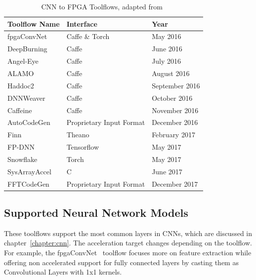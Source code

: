 \begin{table}[!htpb]
    \centering
    \begin{tabular}{lll}
    \hline
    \textbf{Toolflow Name} & \textbf{Interface}       & \textbf{Year}  \\ \hline
    fpgaConvNet            & Caffe \& Torch           & May 2016       \\
    DeepBurning            & Caffe                    & June 2016      \\
    Angel-Eye              & Caffe                    & July 2016      \\
    ALAMO                  & Caffe                    & August 2016    \\
    Haddoc2                & Caffe                    & September 2016 \\
    DNNWeaver              & Caffe                    & October 2016   \\
    Caffeine               & Caffe                    & November 2016  \\
    AutoCodeGen            & Proprietary Input Format & December 2016  \\
    Finn                   & Theano                   & February 2017  \\
    FP-DNN                 & Tensorflow               & May 2017       \\
    Snowflake              & Torch                    & May 2017       \\
    SysArrayAccel          & C                        & June 2017      \\
    FFTCodeGen             & Proprietary Input Format & December 2017  \\ \hline
    \end{tabular}
    \label{table:toolflow}
    \caption{CNN to FPGA Toolflows, adapted from~\cite{misc:cnntofpga}}
\end{table}


\subsection{Supported Neural Network Models}

These toolflows support the most common layers in CNNs, which are discussed in
chapter~\ref{chapter:cnn}. The acceleration target changes depending on the
toolflow.  For example, the fpgaConvNet~\cite{fpgaconvnet} toolflow focuses more
on feature extraction while offering non accelerated support for fully connected
layers by
casting them as Convolutional Layers with 1x1 kernels. 

